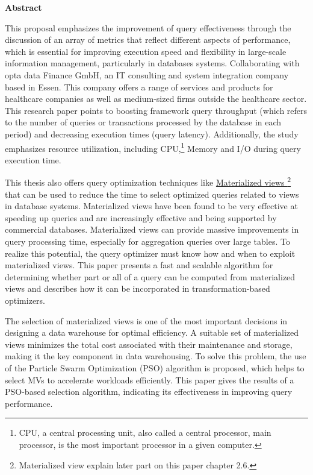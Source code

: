\thispagestyle{empty}
\begin{center}
    \fancyhead[]{}\Large\textbf{Abstract}
\end{center}

\normalsize
This proposal emphasizes the improvement of query effectiveness through the discussion of an array of metrics that reflect different aspects of performance, which is essential for improving execution speed and flexibility in large-scale information management, particularly in databases systems. Collaborating with opta data Finance GmbH, an IT consulting and system integration company based in Essen. This company offers a range of services and products for healthcare companies as well as medium-sized firms outside the healthcare sector. This research paper points to boosting framework query throughput (which refers to the number of queries or transactions processed by the database in each period) and decreasing execution times (query latency). Additionally, the study emphasizes resource utilization,  including CPU,\footnote{CPU, a central processing unit, also called a central processor, main processor, is the most important processor in a given computer.} Memory and I/O during query execution time.\vspace{.4cm}

This thesis also offers query optimization techniques like \hyperref[term:materialized_views]{Materialized views \footnote{Materialized view explain later part on this paper chapter 2.6.}} that can be used to reduce the time to select optimized queries related to views in database systems. Materialized views have been found to be very effective at speeding up queries and are increasingly effective and being supported by commercial databases. Materialized views can provide massive improvements in query processing time, especially for aggregation queries over large tables. To realize this potential, the query optimizer must know how and when to exploit materialized views. This paper presents a fast and scalable algorithm for determining whether part or all of a query can be computed from materialized views and describes how it can be incorporated in transformation-based optimizers.\vspace{.4cm}

The selection of materialized views is one of the most important decisions in designing a data warehouse for optimal efficiency. A suitable set of materialized views minimizes the total cost associated with their maintenance and storage, making it the key component in data warehousing. To solve this problem, the use of the Particle Swarm Optimization (PSO) algorithm is proposed, which helps to select MVs to accelerate workloads efficiently. This paper gives the results of a PSO-based selection algorithm, indicating its effectiveness in improving query performance.\vspace{.4cm}



